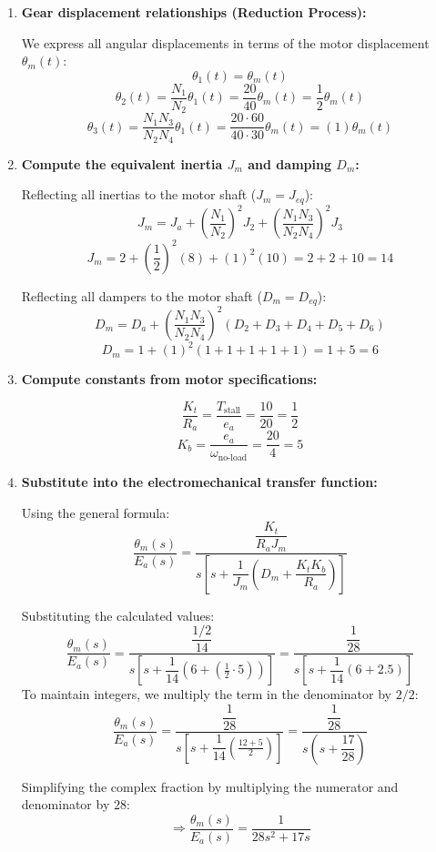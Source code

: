 \documentclass[11pt]{article}
\begin{document}
\begin{enumerate}[label=(\alph*), itemindent=*, leftmargin=*, nolistsep]
    
    \item \textbf{Gear displacement relationships (Reduction Process):}
    
    We express all angular displacements in terms of the motor displacement $\theta_m(t)$:
    \[
    \theta_1(t) = \theta_m(t)
    \]
    \[
    \theta_2(t) = \frac{N_1}{N_2} \theta_1(t) = \frac{20}{40} \theta_m(t) = \frac{1}{2} \theta_m(t)
    \]
    \[
    \theta_3(t) = \frac{N_1 N_3}{N_2 N_4} \theta_1(t) = \frac{20 \cdot 60}{40 \cdot 30} \theta_m(t) = (1) \theta_m(t)
    \]
    
    \item \textbf{Compute the equivalent inertia \( J_m \) and damping \( D_m \):}
    
    Reflecting all inertias to the motor shaft ($J_m = J_{eq}$):
    \[
    J_m = J_a + \left( \frac{N_1}{N_2} \right)^2 J_2 + \left( \frac{N_1 N_3}{N_2 N_4} \right)^2 J_3
    \]
    \[
    J_m = 2 + \left( \frac{1}{2} \right)^2 (8) + (1)^2 (10) = 2 + 2 + 10 = \boxed{14}
    \]
    
    Reflecting all dampers to the motor shaft ($D_m = D_{eq}$):
    \[
    D_m = D_a + \left( \frac{N_1 N_3}{N_2 N_4} \right)^2 (D_2 + D_3 + D_4 + D_5 + D_6)
    \]
    \[
    D_m = 1 + (1)^2 (1 + 1 + 1 + 1 + 1) = 1 + 5 = \boxed{6}
    \]
    
    \item \textbf{Compute constants from motor specifications:}
    
    \[
    \frac{K_t}{R_a} = \frac{T_{\text{stall}}}{e_a} = \frac{10}{20} = \frac{1}{2}
    \]
    \[
    K_b = \frac{e_a}{\omega_{\text{no-load}}} = \frac{20}{4} = 5
    \]
    
    \item \textbf{Substitute into the electromechanical transfer function:}
    
    Using the general formula:
    \[
    \frac{\theta_m(s)}{E_a(s)} = \frac{\dfrac{K_t}{R_a J_m}}{s \left[ s + \dfrac{1}{J_m} \left( D_m + \dfrac{K_t K_b}{R_a} \right) \right]}
    \]
    
    Substituting the calculated values:
    \[
    \frac{\theta_m(s)}{E_a(s)} = \frac{\dfrac{1/2}{14}}{s \left[ s + \dfrac{1}{14} \left( 6 + \left( \frac{1}{2} \cdot 5 \right) \right) \right]} = \frac{\dfrac{1}{28}}{s \left[ s + \dfrac{1}{14} \left( 6 + 2.5 \right) \right]}
    \]
    To maintain integers, we multiply the term in the denominator by $2/2$:
    \[
    \frac{\theta_m(s)}{E_a(s)} = \frac{\dfrac{1}{28}}{s \left[ s + \dfrac{1}{14} \left( \frac{12 + 5}{2} \right) \right]} = \frac{\dfrac{1}{28}}{s \left( s + \dfrac{17}{28} \right)}
    \]
    
    Simplifying the complex fraction by multiplying the numerator and denominator by $28$:
    \[
    \Rightarrow
    \boxed{
        \frac{\theta_m(s)}{E_a(s)} = \frac{1}{28s^2 + 17s}
    }
    \]
    
\end{enumerate}
\end{document}
